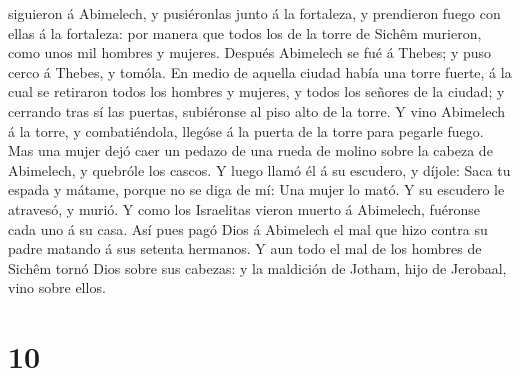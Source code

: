 siguieron á Abimelech, y pusiéronlas junto á la fortaleza, y prendieron
fuego con ellas á la fortaleza: por manera que todos los de la torre de
Sichêm murieron, como unos mil hombres y mujeres.  Después
Abimelech se fué á Thebes; y puso cerco á Thebes, y tomóla.
 En medio de aquella ciudad había una torre fuerte, á la
cual se retiraron todos los hombres y mujeres, y todos los señores de la
ciudad; y cerrando tras sí las puertas, subiéronse al piso alto de la
torre.  Y vino Abimelech á la torre, y combatiéndola,
llegóse á la puerta de la torre para pegarle fuego.  Mas
una mujer dejó caer un pedazo de una rueda de molino sobre la cabeza de
Abimelech, y quebróle los cascos.  Y luego llamó él á su
escudero, y díjole: Saca tu espada y mátame, porque no se diga de mí:
Una mujer lo mató. Y su escudero le atravesó, y murió.  Y
como los Israelitas vieron muerto á Abimelech, fuéronse cada uno á su
casa.  Así pues pagó Dios á Abimelech el mal que hizo
contra su padre matando á sus setenta hermanos.  Y aun todo
el mal de los hombres de Sichêm tornó Dios sobre sus cabezas: y la
maldición de Jotham, hijo de Jerobaal, vino sobre ellos.

\hypertarget{section-9}{%
\section{10}\label{section-9}}

